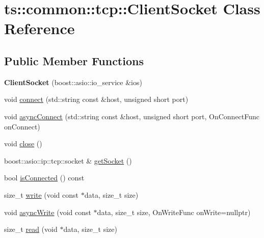\hypertarget{classts_1_1common_1_1tcp_1_1_client_socket}{}\section{ts\+:\+:common\+:\+:tcp\+:\+:Client\+Socket Class Reference}
\label{classts_1_1common_1_1tcp_1_1_client_socket}
\subsection*{Public Member Functions}
\begin{DoxyCompactItemize}
\item 
\mbox{\label{classts_1_1common_1_1tcp_1_1_client_socket_a2d03e028676bd5f58db35c92ebe42029}} 
{\bfseries Client\+Socket} (boost\+::asio\+::io\+\_\+service \&ios)
\item 
void \hyperlink{classts_1_1common_1_1tcp_1_1_client_socket_a0dda673c5f81c70c398c96a2a11ba152}{connect} (std\+::string const \&host, unsigned short port)
\item 
void \hyperlink{classts_1_1common_1_1tcp_1_1_client_socket_a6e852eb6629afd2fa253ccd3fd8a591a}{async\+Connect} (std\+::string const \&host, unsigned short port, On\+Connect\+Func on\+Connect)
\item 
void \hyperlink{classts_1_1common_1_1tcp_1_1_client_socket_a294447025579635cbfa7fe1829eb15a3}{close} ()
\item 
boost\+::asio\+::ip\+::tcp\+::socket \& \hyperlink{classts_1_1common_1_1tcp_1_1_client_socket_a951aaa6937d4acd0020d30aa8481a485}{get\+Socket} ()
\item 
bool \hyperlink{classts_1_1common_1_1tcp_1_1_client_socket_a654e7f9378b5143032c767486f1752f2}{is\+Connected} () const
\item 
size\+\_\+t \hyperlink{classts_1_1common_1_1tcp_1_1_client_socket_aa408490515485ebc5925685fa4cc4b93}{write} (void const $\ast$data, size\+\_\+t size)
\item 
void \hyperlink{classts_1_1common_1_1tcp_1_1_client_socket_acab3419c27934c50c8020b255af1a3ee}{async\+Write} (void const $\ast$data, size\+\_\+t size, On\+Write\+Func on\+Write=nullptr)
\item 
size\+\_\+t \hyperlink{classts_1_1common_1_1tcp_1_1_client_socket_a7876d2f81c6bf60f628973577dfabd2a}{read} (void $\ast$data, size\+\_\+t size)
\item 

\end{DoxyCompactItemize}
